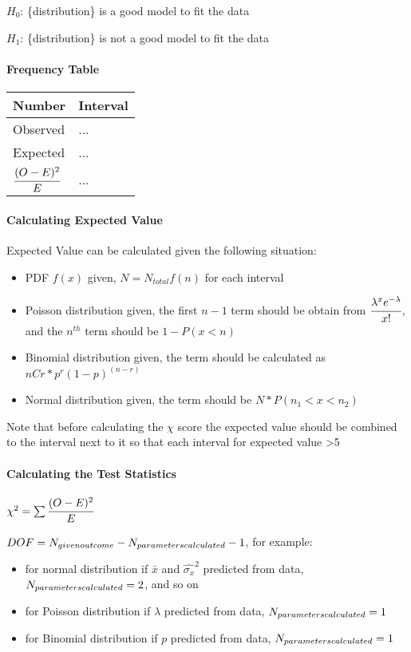 \documentclass[]{article}
\let\oldparagraph\paragraph
\renewcommand{\paragraph}[1]{\oldparagraph{#1}\mbox{}}
\begin{document}
\(H_0\): \{distribution\} is a good model to fit the data

\(H_1\): \{distribution\} is not a good model to fit the data

\paragraph{Frequency Table}\label{header-n243}

\begin{longtable}[]{@{}ll@{}}
\toprule
Number & Interval\tabularnewline
\midrule
\endhead
Observed & ...\tabularnewline
Expected & ...\tabularnewline
\(\cfrac{(O-E)^2}{E}\) & ...\tabularnewline
\bottomrule
\end{longtable}

\paragraph{Calculating Expected Value}\label{header-n257}

Expected Value can be calculated given the following situation:

\begin{itemize}
\item
  PDF \(f(x)\) given, \(N = N_{total} f(n)\) for each interval
\item
  Poisson distribution given, the first \(n-1\) term should be obtain
  from \(\cfrac{\lambda^x e^{-\lambda}}{x!}\), and the \(n^{th}\) term
  should be \(1-P(x<n)\)
\item
  Binomial distribution given, the term should be calculated as
  \(nCr * p^r (1-p)^{(n-r)}\)
\item
  Normal distribution given, the term should be \(N*P(n_1<x<n_2)\)
\end{itemize}

Note that before calculating the \(\chi\) score the expected value
should be combined to the interval next to it so that each interval for
expected value \textgreater{}5

\paragraph{Calculating the Test Statistics}\label{header-n269}

\(\chi ^2 = \sum\cfrac{(O-E)^2}{E}\)

\(DOF = N_{given \space outcome} - N_{parameters\space calculated} - 1\),
for example:

\begin{itemize}
\item
  for normal distribution if \(\bar{x}\) and \(\hat{\sigma_x}^2\)
  predicted from data, \(N_{parameters\space calculated} = 2\), and so
  on
\item
  for Poisson distribution if \(\lambda\) predicted from data,
  \(N_{parameters\space calculated} = 1\)
\item
  for Binomial distribution if \(p\) predicted from data,
  \(N_{parameters\space calculated} = 1\)
\end{itemize}
\end{document}
